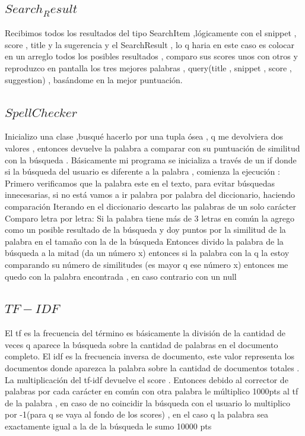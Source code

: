 \documentclass[12pt,a4paper]{article}
\begin{document}
\subsection{$Search_Result$}
Recibimos todos los resultados del tipo SearchItem  ,lógicamente con el snippet , score , title y la sugerencia  y el SearchResult  , lo q haria en este caso es colocar en un arreglo todos los posibles resultados , comparo sus scores unos con otros y  reproduzco en pantalla los tres mejores palabras , query(title , snippet , score , suggestion) , basándome en la mejor puntuación.
\subsection{$SpellChecker$}
Inicializo una clase ,busqué hacerlo por una tupla  ósea , q me devolviera dos valores ,  entonces devuelve la palabra a comparar con su puntuación de similitud con la búsqueda .
 Básicamente mi programa se inicializa a través de un if donde si la búsqueda del usuario es diferente a la palabra , comienza la ejecución :
Primero verificamos que la palabra este en el texto, para evitar búsquedas innecesarias, si no está vamos a ir palabra por palabra del diccionario, haciendo comparación
Iterando en el diccionario descarto  las palabras de un solo carácter
Comparo letra por letra:
Si la palabra tiene más de 3 letras en común  la agrego  como un posible resultado de la búsqueda y doy puntos por la similitud de la palabra en el tamaño con la de la búsqueda
Entonces divido la palabra de la búsqueda a la mitad (da un número x) entonces si la palabra con la q la estoy comparando su número de similitudes (es mayor q ese número x) entonces me quedo con la palabra encontrada , en caso contrario con un null

\subsection{$TF-IDF$}
El tf es la frecuencia del término es básicamente la división de la cantidad de veces q aparece la búsqueda sobre la cantidad de palabras en el documento completo.
El idf  es la frecuencia inversa de documento, este valor representa los documentos donde aparezca la palabra sobre la cantidad de documentos totales .
La multiplicación del tf-idf devuelve el score .
Entonces debido al corrector de palabras por cada carácter en común con otra palabra le múltiplico 1000pts al tf de la palabra , en caso de no coincidir la búsqueda con el usuario lo multiplico por -1(para q se vaya al fondo de los scores) , en el caso q la palabra sea exactamente igual a la de la búsqueda le sumo 10000 pts
\end{document}
